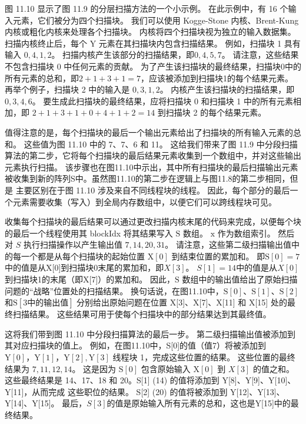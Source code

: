 图 11.10 显示了图 11.9 的分层扫描方法的一个小示例。 在此示例中，有 16 个输入元素，它们被分为四个扫描块。 我们可以使用 Kogge-Stone 内核、Brent-Kung 内核或粗化内核来处理各个扫描块。 内核将四个扫描块视为独立的输入数据集。 扫描内核终止后，每个 Y 元素在其扫描块内包含扫描结果。 例如，扫描块 1 具有输入 $0,4,1,2$。 扫描内核产生该部分的扫描结果，即$0,4,5,7$。 请注意，这些结果不包含扫描块 0 中任何元素的贡献。 为了产生该扫描块的最终结果，扫描块0中的所有元素的总和，即$2+1+3+1=7$，应该被添加到扫描块1的每个结果元素。 再举个例子，扫描块 2 中的输入是 $0,3,1,2$。 内核产生该扫描块的扫描结果，即$0,3,4,6$。 要生成此扫描块的最终结果，应将扫描块 0 和扫描块 1 中的所有元素相加，即 $2+1+3+1+0+4+1+2=14$ 到扫描块 2 的每个结果元素。

值得注意的是，每个扫描块的最后一个输出元素给出了扫描块的所有输入元素的总和。 这些值为图 11.10 中的 7、7、6 和 11。 这给我们带来了图 11.9 中分段扫描算法的第二步，它将每个扫描块的最后结果元素收集到一个数组中，并对这些输出元素执行扫描。 该步骤也在图11.10中示出，其中所有扫描块的最后扫描输出元素被收集到新的阵列S中。虽然图11.10的第二步在逻辑上与图11.8的第二步相同，但是 主要区别在于图 11.10 涉及来自不同线程块的线程。 因此，每个部分的最后一个元素需要收集（写入）到全局内存数组中，以便它们可以跨线程块可见。

收集每个扫描块的最后结果可以通过更改扫描内核末尾的代码来完成，以便每个块的最后一个线程使用其 blockIdx 将其结果写入 $\mathrm{S}$ 数组。 $\mathrm{x}$ 作为数组索引。 然后对 $S$ 执行扫描操作以产生输出值 $7,14,20,31$。 请注意，这些第二级扫描输出值中的每一个都是从每个扫描块的起始位置 $\mathrm{X}[0]$ 到结束位置的累加和。 即$\mathrm{S}[0]=7$中的值是从X[0]到扫描块0末尾的累加和，即$X[3]$。 $S[1]=14$中的值是从$X[0]$到扫描块1的末尾（即X[7]）的累加和。 因此，$\mathrm{S}$ 数组中的输出值给出了原始扫描问题的“战略”位置处的扫描结果。 换句话说，在图11.10中，$\mathrm{S}[0]、\mathrm{S}[1]、\mathrm{S}[2]$和$\mathrm{S}[3中的输出值 ]$ 分别给出原始问题在位置 X[3]、X[7]、X[11] 和 X[15] 处的最终扫描结果。 这些结果可用于使每个扫描块中的部分结果达到其最终值。

这将我们带到图 11.10 中分段扫描算法的最后一步。 第二级扫描输出值被添加到其对应扫描块的值上。 例如，在图11.10中，S[0]的值（值7）将被添加到$\mathrm{Y}[0]，\mathrm{Y}[1]，\mathrm{Y}[2] , \mathrm{Y}[3]$ 线程块 1，完成这些位置的结果。 这些位置的最终结果为 $7,11,12,14$。 这是因为 $\mathrm{S}[0]$ 包含原始输入 $\mathrm{X}[0]$ 到 $X[3]$ 的值之和。 这些最终结果是 14、17、18 和 20。S[1] (14) 的值将添加到 Y[8]、Y[9]、Y[10]、Y[11]，从而完成 这些职位的结果。 S[2] (20) 的值将被添加到 Y[12]、Y[13]、Y[14]、Y[15]。 最后，$S[3]$的值是原始输入所有元素的总和，这也是Y[15]中的最终结果。

